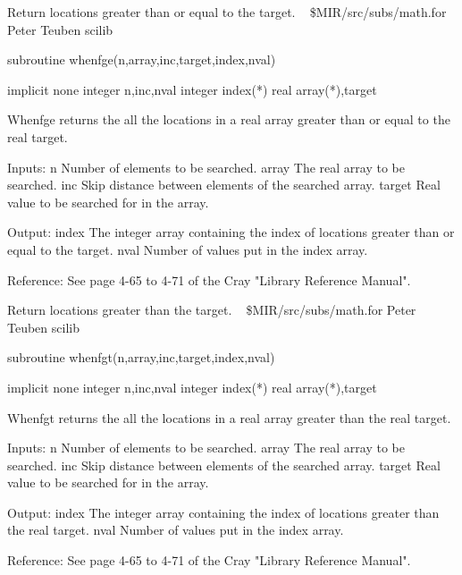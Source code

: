 %
\noindent Return locations greater than or equal to the target.
\newline \ 
\newline {} \$MIR/src/subs/math.for
\newline {} Peter Teuben
\newline {} scilib
\par{\tenpoint
{\eightpoint\begintt
        subroutine whenfge(n,array,inc,target,index,nval)

        implicit none
        integer n,inc,nval
        integer index(*)
        real array(*),target

  Whenfge returns the all the locations in a real array greater than or equal
  to the real target.

  Inputs:
    n          Number of elements to be searched.
    array      The real array to be searched.
    inc        Skip distance between elements of the searched array.
    target     Real value to be searched for in the array.

  Output:
    index      The integer array containing the index of locations
               greater than or equal to the target.
    nval       Number of values put in the index array.

  Reference:
  See page 4-65 to 4-71 of the Cray "Library Reference Manual".
\endtt}
\par}
%
\noindent Return locations greater than the target.
\newline \ 
\newline {} \$MIR/src/subs/math.for
\newline {} Peter Teuben
\newline \abox{Keywords:} scilib
\par{\tenpoint
{\eightpoint\begintt
        subroutine whenfgt(n,array,inc,target,index,nval)

        implicit none
        integer n,inc,nval
        integer index(*)
        real array(*),target

  Whenfgt returns the all the locations in a real array greater than the real
  target.

  Inputs:
    n          Number of elements to be searched.
    array      The real array to be searched.
    inc        Skip distance between elements of the searched array.
    target     Real value to be searched for in the array.

  Output:
    index      The integer array containing the index of locations
               greater than the real target.
    nval       Number of values put in the index array.

  Reference:
  See page 4-65 to 4-71 of the Cray "Library Reference Manual".
\endtt}
\par}
